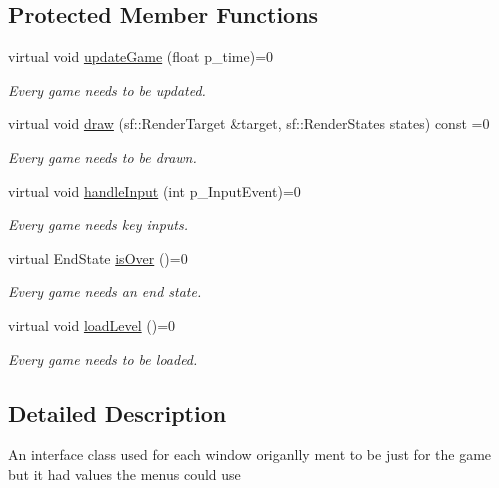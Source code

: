 \subsection*{Protected Member Functions}
\begin{DoxyCompactItemize}
\item 
\mbox{\label{class_game_interface_a5704fbd5713a20e95032dcf1631bdd67}} 
virtual void \mbox{\hyperlink{class_game_interface_a5704fbd5713a20e95032dcf1631bdd67}{update\+Game}} (float p\+\_\+time)=0
\begin{DoxyCompactList}\small\item\em Every game needs to be updated. \end{DoxyCompactList}\item 
virtual void \mbox{\hyperlink{class_game_interface_ab33712e6b22b934982896ea0cab1699a}{draw}} (sf\+::\+Render\+Target \&target, sf\+::\+Render\+States states) const =0
\begin{DoxyCompactList}\small\item\em Every game needs to be drawn. \end{DoxyCompactList}\item 
virtual void \mbox{\hyperlink{class_game_interface_a48b4f6059c14c79359d30b77016a28f0}{handle\+Input}} (int p\+\_\+\+Input\+Event)=0
\begin{DoxyCompactList}\small\item\em Every game needs key inputs. \end{DoxyCompactList}\item 
virtual End\+State \mbox{\hyperlink{class_game_interface_a5bad60f237214cb1ec013e221ed16f45}{is\+Over}} ()=0
\begin{DoxyCompactList}\small\item\em Every game needs an end state. \end{DoxyCompactList}\item 
\mbox{\label{class_game_interface_a48c841b894ea37938996e3d5a40353b5}} 
virtual void \mbox{\hyperlink{class_game_interface_a48c841b894ea37938996e3d5a40353b5}{load\+Level}} ()=0
\begin{DoxyCompactList}\small\item\em Every game needs to be loaded. \end{DoxyCompactList}\end{DoxyCompactItemize}


\subsection{Detailed Description}
An interface class used for each window origanlly ment to be just for the game but it had values the menu\textquotesingle{}s could use 

